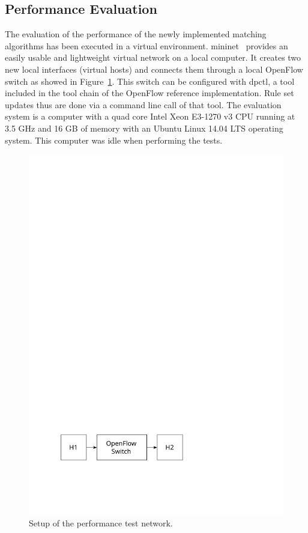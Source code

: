 \documentclass[a4paper,
		12pt,
		parskip=full,
		titlepage
		]{scrartcl}
\begin{document}
\subsection{Performance Evaluation}
The evaluation of the performance of the newly implemented matching algorithms has been executed in a virtual environment.
\textsf{mininet}~\cite{mininet} provides an easily usable and lightweight virtual network on a local computer.
It creates two new local interfaces (virtual hosts) and connects them through 
a local OpenFlow switch as showed in Figure~\ref{fig:ofswitch-perftest}.
This switch can be configured with \textsf{dpctl}, a tool included in the tool chain of the OpenFlow reference implementation.
Rule set updates thus are done via a command line call of that tool.
The evaluation system is a computer with a quad core Intel Xeon E3-1270 v3 CPU 
running at 3.5 GHz and 16 GB of memory with an Ubuntu Linux 14.04 LTS operating system.
This computer was idle when performing the tests.

\begin{figure}
\centering
\includegraphics[height=0.1\textheight]{images/ofswitch-perftest}
\caption{Setup of the performance test network.}
\label{fig:ofswitch-perftest}
\end{figure}
\end{document}
